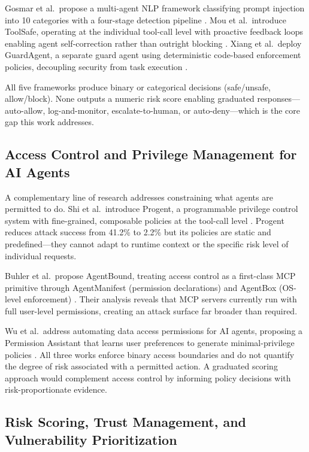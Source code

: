 \documentclass[12pt]{article}
\begin{document}
Gosmar et al.\ propose a multi-agent NLP framework classifying prompt injection into 10 categories with a four-stage detection pipeline \cite{gosmar2025prompt_injection}. Mou et al.\ introduce ToolSafe, operating at the individual tool-call level with proactive feedback loops enabling agent self-correction rather than outright blocking \cite{mou2026toolsafe}. Xiang et al.\ deploy GuardAgent, a separate guard agent using deterministic code-based enforcement policies, decoupling security from task execution \cite{xiang2025guardagent}.

All five frameworks produce binary or categorical decisions (safe/unsafe, allow/block). None outputs a numeric risk score enabling graduated responses---auto-allow, log-and-monitor, escalate-to-human, or auto-deny---which is the core gap this work addresses.

\subsection{Access Control and Privilege Management for AI Agents}

A complementary line of research addresses constraining what agents are permitted to do. Shi et al.\ introduce Progent, a programmable privilege control system with fine-grained, composable policies at the tool-call level \cite{shi2025progent}. Progent reduces attack success from 41.2\% to 2.2\% but its policies are static and predefined---they cannot adapt to runtime context or the specific risk level of individual requests.

Buhler et al.\ propose AgentBound, treating access control as a first-class MCP primitive through AgentManifest (permission declarations) and AgentBox (OS-level enforcement) \cite{buhler2025agentbound}. Their analysis reveals that MCP servers currently run with full user-level permissions, creating an attack surface far broader than required.

Wu et al.\ address automating data access permissions for AI agents, proposing a Permission Assistant that learns user preferences to generate minimal-privilege policies \cite{wu2025automating_data_access}. All three works enforce binary access boundaries and do not quantify the degree of risk associated with a permitted action. A graduated scoring approach would complement access control by informing policy decisions with risk-proportionate evidence.

\subsection{Risk Scoring, Trust Management, and Vulnerability Prioritization}
\end{document}
